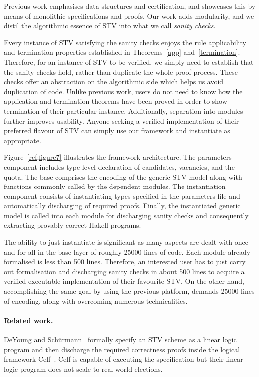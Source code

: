 \documentclass{llncs}
\begin{document}
Previous work emphasises data structures and certification, and showcases this by means of monolithic specifications and proofs. Our work adds modularity,  and we distil the algorithmic essence of STV into what we call \emph{sanity checks}.

Every instance of STV satisfying the sanity checks enjoys the rule applicability and termination properties established in Theorems~\ref{app} and~\ref{termination}. Therefore, for an instance of STV to be verified, we simply need to  establish that the sanity checks hold, 
rather than duplicate the whole proof process. These checks
offer an abstraction on the algorithmic side which helps us
avoid duplication of code. Unlike previous work, users do
not need to know how the application  and termination theorems have been proved in order to show termination of their particular instance. Additionally, separation into modules further improves usability. Anyone seeking a verified implementation of their preferred flavour of STV can simply use our framework and instantiate as appropriate. 

Figure~\ref{ref;figure7} illustrates the framework architecture. The parameters component includes type level declaration of candidates, vacancies, and the quota. The base comprises the encoding of the generic STV model along with functions commonly called by the dependent modules. The  instantiation component consists of instantiating types specified in the parameters file and automatically discharging of required proofs. Finally, the instantiated generic model is called into each module for discharging sanity checks and consequently extracting provably correct Hakell programs.
   

The ability to just instantiate is significant as many
aspects are dealt with once and for all
in the base layer of roughly 25000 lines of
code. Each module already formalised is less than 500 lines.
Therefore, an interested user has to just carry out formalisation and discharging sanity checks in about 500 lines to acquire a verified executable implementation of their favourite STV. On the other hand, accomplishing the same goal by using the previous platform, demands  25000 lines of encoding, along with overcoming numerous technicalities.   

\paragraph{\textbf{Related work.}}
DeYoung and Sch\"urmann~\cite{DeYoung:2012:LLV}
formally specify an STV
scheme as a linear logic~\cite{DBLP:journals/apal/Girard93} program
and then discharge the required correctness 
proofs inside the logical framework
Celf~\cite{DBLP:conf/cade/Schack-NielsenS08}. Celf is capable of
executing the specification but their linear logic program does not scale to real-world
elections.
\end{document}
